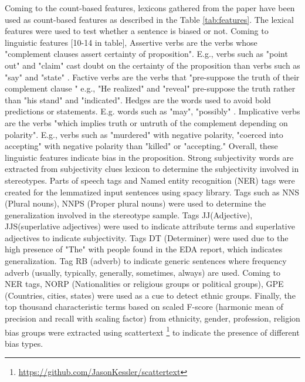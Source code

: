 Coming to the count-based features, lexicons gathered from the paper  \cite{recasens2013linguistic}  have been used as count-based features as described in the Table \ref{tab:features}. The lexical features were used to test whether a sentence is biased or not. Coming to linguistic features [10-14 in table], Assertive verbs \cite{hooper1975assertive} are the verbs whose "complement clauses assert certainty of proposition"\cite{recasens2013linguistic}. E.g., verbs such as "point out" and "claim" cast doubt on the certainty of the proposition than verbs such as "say" and "state" \cite{recasens2013linguistic}. Factive verbs \cite{kiparsky1970progress} are the verbs that "pre-suppose the truth of their complement clause "\cite{recasens2013linguistic} e.g., "He realized" and "reveal" pre-suppose the truth rather than  "his stand" and "indicated". Hedges are the words used to avoid bold predictions or statements. E.g. words such as "may", "possibly" \cite{recasens2013linguistic}. Implicative verbs \cite{karttunen1971implicative} are the verbs "which implies truth or untruth of the complement depending on polarity"\cite{recasens2013linguistic}. E.g., verbs such as "murdered" with negative polarity, "coerced into accepting" with negative polarity than "killed" or "accepting." Overall, these linguistic features indicate bias in the proposition. Strong subjectivity words are extracted from subjectivity clues lexicon \cite{wilson2005recognizing} to determine the subjectivity involved in stereotypes. Parts of speech tags and Named entity recognition (NER) tags were created for the lemmatized input sentences using spacy library. Tags such as NNS (Plural nouns), NNPS (Proper plural nouns) were used to determine the generalization involved in the stereotype sample. Tags JJ(Adjective), JJS(superlative adjectives) were used to indicate attribute terms and superlative adjectives to indicate subjectivity. Tags DT (Determiner) were used due to the high presence of "The" with people found in the EDA report, which indicates generalization. Tag RB (adverb) to indicate generic sentences where frequency adverb (usually, typically, generally, sometimes, always) are used. Coming to NER tags, NORP (Nationalities or religious groups or political groups), GPE (Countries, cities, states) were used as a cue to detect ethnic groups. Finally, the top thousand characteristic terms based on scaled F-score (harmonic mean of precision and recall with scaling factor) from ethnicity, gender, profession, religion bias groups were extracted using scattertext \footnote{\url{https://github.com/JasonKessler/scattertext}} to indicate the presence of different bias types.

